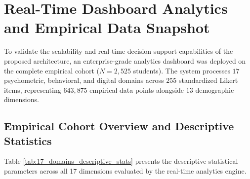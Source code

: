 
\section{Real-Time Dashboard Analytics and Empirical Data Snapshot}
\label{sec:dashboard_empirical_snapshot}

To validate the scalability and real-time decision support capabilities of the proposed architecture, an enterprise-grade analytics dashboard was deployed on the complete empirical cohort ($N = 2,525$ students). The system processes $17$ psychometric, behavioral, and digital domains across $255$ standardized Likert items, representing $643,875$ empirical data points alongside $13$ demographic dimensions.

\subsection{Empirical Cohort Overview and Descriptive Statistics}
Table \ref{tab:17_domains_descriptive_stats} presents the descriptive statistical parameters across all 17 dimensions evaluated by the real-time analytics engine.

